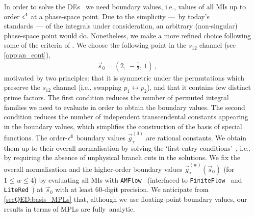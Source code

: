 \documentclass[main.tex]{subfiles}
\begin{document}
In order to solve the DEs~ we need boundary values, i.e., values of all MIs up to order $\epsilon^4$ at a phase-space point. 
Due to the simplicity ---~by today's standards~--- of the integrals under consideration, an arbitrary (non-singular) phase-space point would do. 
Nonetheless, we make a more refined choice following some of the criteria of .
We choose the following point in the $s_{12}$ channel (see \cref{app:an_cont}),
\begin{align} \label{eqQED:s0}
\vec{s}_0 = \left( 2, \, -\frac{1}{2}, \, 1 \right) \,,
\end{align}
motivated by two principles: that it is symmetric under the permutations which preserve the $s_{12}$ channel (i.e., swapping $p_1 \leftrightarrow p_2$), and that it contains few distinct prime factors.
The first condition reduces the number of permuted integral families we need to evaluate in order to obtain the boundary values.
The second condition reduces the number of independent transcendental constants appearing in the boundary values, which simplifies the construction of the basis of special functions. 
The order-$\epsilon^0$ boundary values $\vec{g}_{\tau}^{(0)}$ are rational constants. We obtain them up to their overall normalisation by solving the `first-entry conditions'~\cite{Gaiotto:2011dt}, i.e., by requiring the absence of unphysical branch cuts in the solutions. We fix the overall normalisation and the higher-order boundary values $\vec{g}_{\tau}^{(w)}(\vec{s}_0)$ (for $1\le w\le 4$) by evaluating all MIs with \texttt{AMFlow}~\cite{Liu:2022chg} (interfaced to 
\texttt{FiniteFlow}~\cite{Peraro:2019svx} and \texttt{LiteRed}~\cite{Lee:2012cn}) at $\vec{s}_0$ with at least $60$-digit precision.
We anticipate from \cref{secQED:basis_MPLs} that, although we use floating-point boundary values, our results in terms of MPLs are fully~analytic. 
\end{document}
